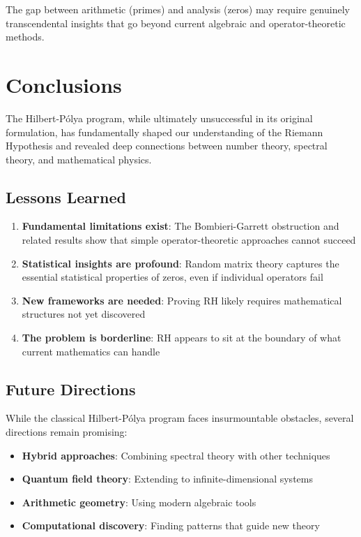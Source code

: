 \begin{remark}
The gap between arithmetic (primes) and analysis (zeros) may require genuinely transcendental insights that go beyond current algebraic and operator-theoretic methods.
\end{remark}

\section{Conclusions}
\label{sec:hp_conclusions}

The Hilbert-Pólya program, while ultimately unsuccessful in its original formulation, has fundamentally shaped our understanding of the Riemann Hypothesis and revealed deep connections between number theory, spectral theory, and mathematical physics.

\subsection{Lessons Learned}

\begin{enumerate}
\item \textbf{Fundamental limitations exist}: The Bombieri-Garrett obstruction and related results show that simple operator-theoretic approaches cannot succeed

\item \textbf{Statistical insights are profound}: Random matrix theory captures the essential statistical properties of zeros, even if individual operators fail

\item \textbf{New frameworks are needed}: Proving RH likely requires mathematical structures not yet discovered

\item \textbf{The problem is borderline}: RH appears to sit at the boundary of what current mathematics can handle
\end{enumerate}

\subsection{Future Directions}

While the classical Hilbert-Pólya program faces insurmountable obstacles, several directions remain promising:

\begin{itemize}
\item \textbf{Hybrid approaches}: Combining spectral theory with other techniques
\item \textbf{Quantum field theory}: Extending to infinite-dimensional systems
\item \textbf{Arithmetic geometry}: Using modern algebraic tools
\item \textbf{Computational discovery}: Finding patterns that guide new theory
\end{itemize}

